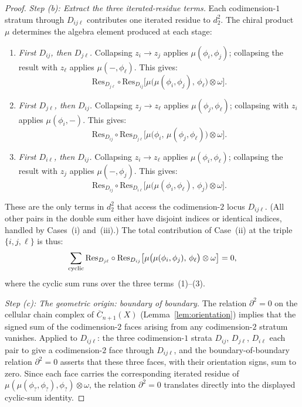 \begin{proof}
\smallskip
\emph{Step (b): Extract the three iterated-residue terms.}
Each codimension-$1$ stratum through $D_{ij\ell}$ contributes
one iterated residue to $d_2^2$. The chiral product
$\mu$ determines the algebra element produced at each stage:
\begin{enumerate}[label=\textup{(\arabic*)}]
\item \emph{First $D_{ij}$, then $D_{j\ell}$.}
 Collapsing $z_i\to z_j$ applies
 $\mu(\phi_i,\phi_j)$; collapsing the result with $z_\ell$
 applies $\mu(-,\phi_\ell)$. This gives:
 \[
 \text{Res}_{D_{j\ell}}\circ\text{Res}_{D_{ij}}
 \bigl[\mu\bigl(\mu(\phi_i,\phi_j),\,\phi_\ell\bigr)
 \otimes\omega\bigr].
 \]
\item \emph{First $D_{j\ell}$, then $D_{ij}$.}
 Collapsing $z_j\to z_\ell$ applies
 $\mu(\phi_j,\phi_\ell)$; collapsing with $z_i$ applies
 $\mu(\phi_i,-)$. This gives:
 \[
 \text{Res}_{D_{ij}}\circ\text{Res}_{D_{j\ell}}
 \bigl[\mu\bigl(\phi_i,\,\mu(\phi_j,\phi_\ell)\bigr)
 \otimes\omega\bigr].
 \]
\item \emph{First $D_{i\ell}$, then $D_{ij}$.}
 Collapsing $z_i\to z_\ell$ applies
 $\mu(\phi_i,\phi_\ell)$; collapsing the result with $z_j$
 applies $\mu(-,\phi_j)$. This gives:
 \[
 \text{Res}_{D_{ij}}\circ\text{Res}_{D_{i\ell}}
 \bigl[\mu\bigl(\mu(\phi_i,\phi_\ell),\,\phi_j\bigr)
 \otimes\omega\bigr].
 \]
\end{enumerate}
These are the only terms in $d_2^2$ that access the
codimension-$2$ locus $D_{ij\ell}$. (All other pairs in the
double sum either have disjoint indices or identical indices,
handled by Cases~(i) and~(iii).) The total contribution of
Case~(ii) at the triple $\{i,j,\ell\}$ is thus:
\begin{equation}
\sum_{\textup{cyclic}}
 \text{Res}_{D_{j\ell}}\circ\text{Res}_{D_{ij}}
 \bigl[\mu\bigl(\mu(\phi_i,\phi_j),\,\phi_\ell\bigr)
 \otimes\omega\bigr]
= 0,
\end{equation}
where the cyclic sum runs over the three terms~(1)--(3).

\smallskip
\emph{Step (c): The geometric origin: boundary of boundary.}
The relation $\partial^2=0$ on the cellular chain complex of
$\overline{C}_{n+1}(X)$ (Lemma~\ref{lem:orientation}) implies
that the signed sum of the codimension-$2$ faces arising from
any codimension-$2$ stratum vanishes. Applied to $D_{ij\ell}$:
the three codimension-$1$ strata $D_{ij}$, $D_{j\ell}$,
$D_{i\ell}$ each pair to give a codimension-$2$ face through
$D_{ij\ell}$, and the boundary-of-boundary relation
$\partial^2=0$ asserts that these three faces, with their
orientation signs, sum to zero. Since each face carries the
corresponding iterated residue of
$\mu(\mu(\phi_?,\phi_?),\phi_?)\otimes\omega$, the relation
$\partial^2=0$ translates directly into the displayed cyclic-sum
identity.


\end{proof}

